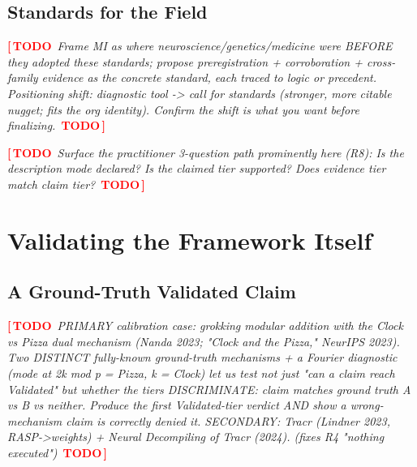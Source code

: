 \documentclass{article}
\newcommand{\TODO}[1]{\par\smallskip\noindent\textcolor{red}{\textbf{[\,TODO}}\ \textit{\textcolor{black!65}{#1}}\ \textcolor{red}{\textbf{TODO\,]}}\par\smallskip}
\begin{document}
\subsection{Standards for the Field}
\TODO{Frame MI as where neuroscience/genetics/medicine were BEFORE they adopted these standards;
propose preregistration + corroboration + cross-family evidence as the concrete standard, each
traced to logic or precedent. Positioning shift: diagnostic tool -> call for standards (stronger,
more citable nugget; fits the org identity). Confirm the shift is what you want before finalizing.}
\TODO{Surface the practitioner 3-question path prominently here (R8): Is the description mode
declared? Is the claimed tier supported? Does evidence tier match claim tier?}

\section{Validating the Framework Itself}
\label{sec:self-validation}

\subsection{A Ground-Truth Validated Claim}
\TODO{PRIMARY calibration case: grokking modular addition with the Clock vs Pizza dual mechanism
(Nanda 2023; "Clock and the Pizza," NeurIPS 2023). Two DISTINCT fully-known ground-truth
mechanisms + a Fourier diagnostic (mode at 2k mod p = Pizza, k = Clock) let us test not just
"can a claim reach Validated" but whether the tiers DISCRIMINATE: claim matches ground truth A
vs B vs neither. Produce the first Validated-tier verdict AND show a wrong-mechanism claim is
correctly denied it. SECONDARY: Tracr (Lindner 2023, RASP->weights) + Neural Decompiling of Tracr
(2024). (fixes R4 "nothing executed")}
\end{document}
